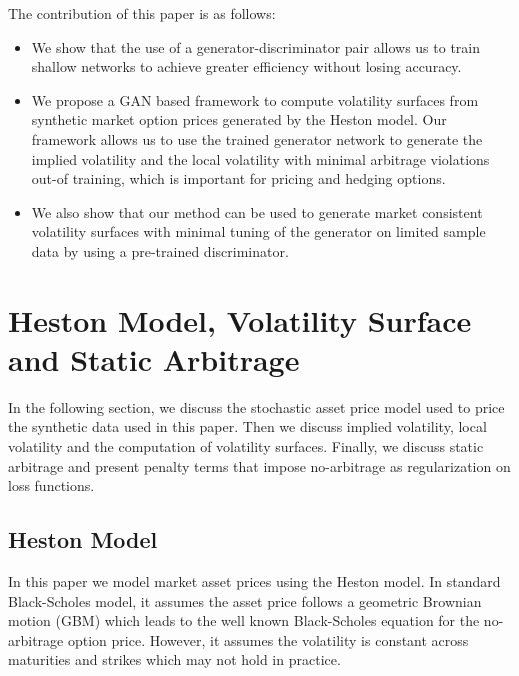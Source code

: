 \documentclass{article}
\theoremstyle{plain}%
\theoremstyle{definition}
\theoremstyle{remark}
\begin{document}
The contribution of this paper is as follows:
\begin{itemize}
\item We show that the use of a generator-discriminator pair allows us to train shallow networks to achieve greater efficiency without losing accuracy.
\item We propose a GAN based framework to compute volatility surfaces from synthetic market option prices generated by the Heston model. Our framework allows us to use the trained generator network to generate the implied volatility and the local volatility with minimal arbitrage violations out-of training, which is important for pricing and hedging options. 
\item We also show that our method can be used to generate market consistent volatility surfaces with minimal tuning of the generator on limited sample data by using a pre-trained discriminator.
\end{itemize}

\section{Heston Model, Volatility Surface and Static Arbitrage}\label{sec:background}
In the following section, we discuss the stochastic asset price model used to price the synthetic data used in this paper. Then we discuss implied volatility, local volatility and the computation of volatility surfaces. Finally, we discuss static arbitrage and present penalty terms that impose no-arbitrage as regularization on loss functions.

\subsection{Heston Model}
In this paper we model market asset prices using the Heston model. In standard Black-Scholes model, it assumes the asset price follows a geometric Brownian motion (GBM) which leads to the well known Black-Scholes equation for the no-arbitrage option price. However, it assumes the volatility is constant across maturities and strikes which may not hold in practice.
\end{document}
